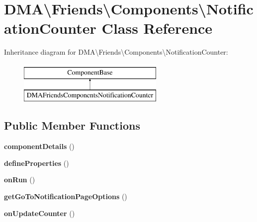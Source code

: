 \hypertarget{classDMA_1_1Friends_1_1Components_1_1NotificationCounter}{\section{D\+M\+A\textbackslash{}Friends\textbackslash{}Components\textbackslash{}Notification\+Counter Class Reference}
\label{classDMA_1_1Friends_1_1Components_1_1NotificationCounter}
}
Inheritance diagram for D\+M\+A\textbackslash{}Friends\textbackslash{}Components\textbackslash{}Notification\+Counter\+:\begin{figure}[H]
\begin{center}
\leavevmode
\includegraphics[height=2.000000cm]{d7/def/classDMA_1_1Friends_1_1Components_1_1NotificationCounter}
\end{center}
\end{figure}
\subsection*{Public Member Functions}
\begin{DoxyCompactItemize}
\item 
\hypertarget{classDMA_1_1Friends_1_1Components_1_1NotificationCounter_a670cc0b67254ca6330cb90e78d00ec50}{{\bfseries component\+Details} ()}\label{classDMA_1_1Friends_1_1Components_1_1NotificationCounter_a670cc0b67254ca6330cb90e78d00ec50}

\item 
\hypertarget{classDMA_1_1Friends_1_1Components_1_1NotificationCounter_acc9c8dda0d8fcb5d55f8b6bdcd93914e}{{\bfseries define\+Properties} ()}\label{classDMA_1_1Friends_1_1Components_1_1NotificationCounter_acc9c8dda0d8fcb5d55f8b6bdcd93914e}

\item 
\hypertarget{classDMA_1_1Friends_1_1Components_1_1NotificationCounter_a11868691e1796cd39a3821cf8fa752a0}{{\bfseries on\+Run} ()}\label{classDMA_1_1Friends_1_1Components_1_1NotificationCounter_a11868691e1796cd39a3821cf8fa752a0}

\item 
\hypertarget{classDMA_1_1Friends_1_1Components_1_1NotificationCounter_aa2ef7ee56cae987954e55457d8f790c4}{{\bfseries get\+Go\+To\+Notification\+Page\+Options} ()}\label{classDMA_1_1Friends_1_1Components_1_1NotificationCounter_aa2ef7ee56cae987954e55457d8f790c4}

\item 
\hypertarget{classDMA_1_1Friends_1_1Components_1_1NotificationCounter_a4224d3d34ae20ed7dadf26de47bf4873}{{\bfseries on\+Update\+Counter} ()}\label{classDMA_1_1Friends_1_1Components_1_1NotificationCounter_a4224d3d34ae20ed7dadf26de47bf4873}

\end{DoxyCompactItemize}
